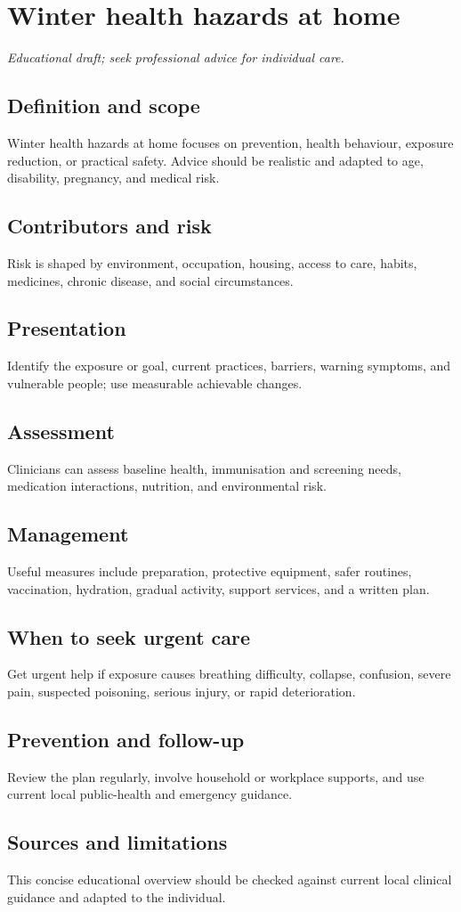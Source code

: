 \chapter{Winter health hazards at home}
\medskip
\noindent\textit{Educational draft; seek professional advice for individual care.}

\section*{Definition and scope}
Winter health hazards at home focuses on prevention, health behaviour, exposure reduction, or practical safety. Advice should be realistic and adapted to age, disability, pregnancy, and medical risk.

\section*{Contributors and risk}
Risk is shaped by environment, occupation, housing, access to care, habits, medicines, chronic disease, and social circumstances.

\section*{Presentation}
Identify the exposure or goal, current practices, barriers, warning symptoms, and vulnerable people; use measurable achievable changes.

\section*{Assessment}
Clinicians can assess baseline health, immunisation and screening needs, medication interactions, nutrition, and environmental risk.

\section*{Management}
Useful measures include preparation, protective equipment, safer routines, vaccination, hydration, gradual activity, support services, and a written plan.

\section*{When to seek urgent care}
Get urgent help if exposure causes breathing difficulty, collapse, confusion, severe pain, suspected poisoning, serious injury, or rapid deterioration.

\section*{Prevention and follow-up}
Review the plan regularly, involve household or workplace supports, and use current local public-health and emergency guidance.

\section*{Sources and limitations}
This concise educational overview should be checked against current local clinical guidance and adapted to the individual.
